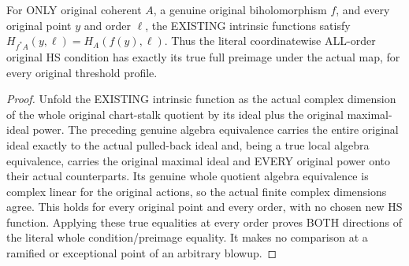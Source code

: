 \begin{theorem}
\label{hir:actual-biholomorphic-intrinsic-whole-ambient-hs-invariance}
\leanok
For ONLY original coherent $A$, a genuine original biholomorphism $f$, and
every original point $y$ and order $\ell$, the EXISTING intrinsic functions
satisfy $H_{f^*A}(y,\ell)=H_A(f(y),\ell)$. Thus the literal coordinatewise
ALL-order original HS condition has exactly its true full preimage under
the actual map, for every original threshold profile.
\end{theorem}
\begin{proof}
Unfold the EXISTING intrinsic function as the actual complex dimension of
the whole original chart-stalk quotient by its ideal plus the original
maximal-ideal power. The preceding genuine algebra equivalence carries
the entire original ideal exactly to the actual pulled-back ideal and,
being a true local algebra equivalence, carries the original maximal ideal
and EVERY original power onto their actual counterparts. Its genuine
whole quotient algebra equivalence is complex linear for the original
actions, so the actual finite complex dimensions agree. This holds for
every original point and every order, with no chosen new HS function.
Applying these true equalities at every order proves BOTH directions of
the literal whole condition/preimage equality. It makes no comparison at
a ramified or exceptional point of an arbitrary blowup.
\end{proof}
